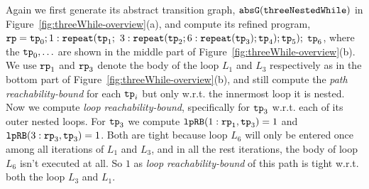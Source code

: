 \begin{example}
Again we first generate its abstract transition graph, $\mathtt{abs}{\mathtt{G}}(\mathtt{threeNestedWhile})$ in Figure~\ref{fig:threeWhile-overview}(a),
and compute its refined program,
$\mathtt{rp} = \mathtt{tp}_0; 1: \mathtt{repeat}(\mathtt{tp}_1;$ 
$3: {\mathtt{repeat}(\mathtt{tp}_2; 6 : {\mathtt{repeat}(\mathtt{tp}_3)}; \mathtt{tp}_4)}; \mathtt{tp}_5);$ 
$\mathtt{tp}_6$,
where the $\mathtt{tp}_0, \ldots$ are shown in the middle part of Figure~\ref{fig:threeWhile-overview}(b).
We use $\mathtt{rp}_1$ and $\mathtt{rp}_3$ denote the body of the loop $L_1$ and $L_3$ respectively as in the bottom part of Figure~\ref{fig:threeWhile-overview}(b), and still compute the \emph{path reachability-bound} for each $\mathtt{tp}_i$ but only w.r.t. the innermost loop it is nested.
Now we compute \emph{loop reachability-bound}, specifically for $\mathtt{tp}_3$ w.r.t. each of its outer nested loops.
For $\mathtt{tp}_3$ we compute
$\mathtt{lpRB}(1: \mathtt{rp}_1, \mathtt{tp}_3) = 1$ and
$\mathtt{lpRB}(3: \mathtt{rp}_3, \mathtt{tp}_3) = 1$.
Both are tight because loop $L_6$ will only be entered once among all iterations of $L_1$ and $L_3$, and in all the rest iterations, the body of loop $L_6$ isn't executed at all.
So $1$ as \emph{loop reachability-bound} of this path is tight w.r.t. both the loop $L_3$ and $L_1$.
\end{example}
